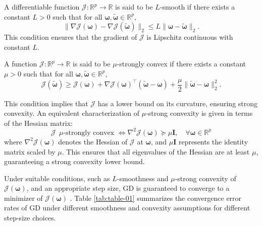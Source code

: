 \begin{definition}
A differentiable function $\mathcal{J}: \mathbb{R}^p \to \mathbb{R}$ is said to be $L$-smooth if there exists a constant $L > 0$ such that for all $\bm\omega, \bm{\tilde{\omega}} \in \mathbb{R}^p$,\\
\begin{equation} \label{eq:L_smoothness}
    \| \nabla \mathcal{J}(\bm{\omega}) - \nabla \mathcal{J}(\bm{\tilde{\omega}}) \|_2 \leq L \| \bm{\omega} - \bm{\tilde{\omega}} \|_2.
\end{equation}
This condition ensures that the gradient of $\mathcal{J}$ is Lipschitz continuous with constant $L$.
\end{definition}
\begin{definition}
A function $\mathcal{J}: \mathbb{R}^p \to \mathbb{R}$ is said to be $\mu$-strongly convex if there exists a constant $\mu > 0$ such that for all $\bm\omega, \bm{\tilde{\omega}} \in \mathbb{R}^p$,\\
\begin{equation} \label{eq:mu_strong_convexity}
    \mathcal{J}(\bm{\tilde{\omega}}) \geq \mathcal{J}(\bm\omega) + \nabla \mathcal{J}(\bm\omega)^{\top}(\bm{\tilde{\omega}} - \bm\omega) + \frac{\mu}{2} \| \bm{\tilde{\omega}} - \bm\omega \|_2^2.
\end{equation}
\end{definition}
This condition implies that $\mathcal{J}$ has a lower bound on its curvature, ensuring strong convexity. An equivalent characterization of $\mu$-strong convexity is given in terms of the Hessian matrix:\\
\begin{equation} \label{eq:hessian_characterization}
    \mathcal{J} ~~ \mu\text{-strongly convex~} \Leftrightarrow \nabla^2 \mathcal{J}(\bm\omega) \succeq \mu \mathbf{I}, \quad \forall \bm\omega \in \mathbb{R}^p
\end{equation}
where $\nabla^2 \mathcal{J}(\bm\omega)$ denotes the Hessian of $\mathcal{J}$ at $\bm\omega$, and $\mu \mathbf{I}$ represents the identity matrix scaled by $\mu$. This ensures that all eigenvalues of the Hessian are at least $\mu$, guaranteeing a strong convexity lower bound.

Under suitable conditions, such as $L$-smoothness and $\mu$-strong convexity of $\mathcal{J}(\bm\omega)$, and an appropriate step size, GD is guaranteed to converge to a minimizer of $\mathcal{J}(\bm\omega)$ \cite{garrigos2023handbook}. Table \ref{tab:table-01} summarizes the convergence error rates of GD under different smoothness and convexity assumptions for different step-size choices.

